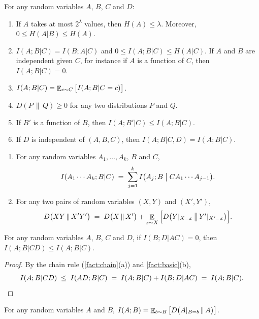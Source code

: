 \begin{fact}\label{fact:basic}
For any random variables $A$, $B$, $C$ and $D$:
\begin{enumerate}[label=(\alph*)]
  \item If $A$ takes at most $2^\lambda$ values, then $H(A) \le \lambda$. Moreover, $0 \le H(A | B) \le H(A)$.
  \item $I(A; B | C) = I(B; A | C)$ and $0 \le I(A; B | C) \le H(A | C)$. If $A$ and $B$ are independent given $C$, for instance if $A$ is a function of $C$, then $I(A; B | C) = 0$.
  \item $I(A; B | C) = \mathop{\mathbb{E}}_{c \sim C}\big[I(A; B | C = c)\big]$.
  \item $D(P \,\|\, Q) \ge 0$ for any two distributions $P$ and $Q$.
  \item If $B'$ is a function of $B$, then $I(A; B' | C) \le I(A; B | C)$.
  \item If $D$ is independent of $(A, B, C)$, then $I(A; B | C, D) = I(A; B | C)$.
\end{enumerate}
\end{fact}

\begin{fact}\label{fact:chain}
\begin{enumerate}[label=(\alph*)]
  \item For any random variables $A_1, \dots, A_k$, $B$ and $C$,
  \[ I(A_1 \cdots A_k; B | C) \;=\; \sum_{j=1}^{k} I\big(A_j; B \bigm| C A_1 \cdots A_{j-1}\big). \]
  \item For any two pairs of random variables $(X, Y)$ and $(X', Y')$,
  \[ D\big(XY \,\|\, X'Y'\big) \;=\; D\big(X \,\|\, X'\big) + \mathop{\mathbb{E}}_{x \sim X}\Big[D\big(Y|_{X = x} \,\big\|\, Y'|_{X' = x}\big)\Big]. \]
\end{enumerate}
\end{fact}

\begin{fact}\label{fact:drop-cond}
For any random variables $A$, $B$, $C$ and $D$, if $I(B; D | A C) = 0$, then $I(A; B | C D) \le I(A; B | C)$.
\end{fact}
\begin{proof}
By the chain rule (\cref{fact:chain}(a)) and \cref{fact:basic}(b),
\[ I(A; B | C D) \;\le\; I(A D; B | C) \;=\; I(A; B | C) + I(B; D | A C) \;=\; I(A; B | C). \qedhere \]
\end{proof}

\begin{fact}\label{fact:kl-mi}
For any random variables $A$ and $B$, $I(A; B) = \mathop{\mathbb{E}}_{b \sim B}\big[D\big(A|_{B=b} \,\|\, A\big)\big]$.
\end{fact}

